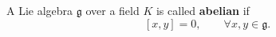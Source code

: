 A Lie algebra $\mathfrak{g}$ over a field $K$ is called \textbf{abelian} if
$$
[x, y] = 0, \qquad \forall x, y \in \mathfrak{g}.
$$
